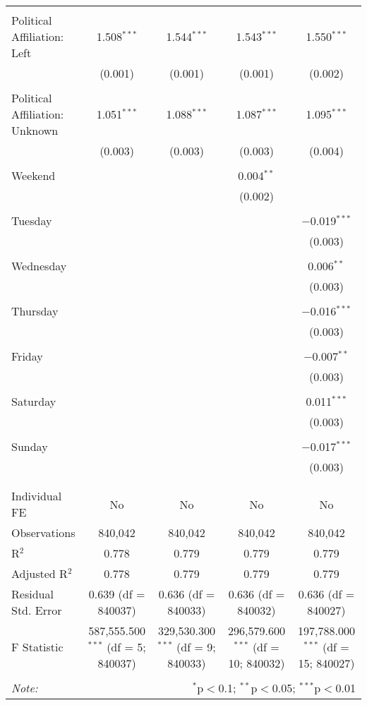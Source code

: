 \documentclass[
]{article}
\begin{document}
\begin{table}[!htbp]
{\begin{tabular}{@{\extracolsep{5pt}}lcccc}
  & & & & \\ 
 Political Affiliation: Left & 1.508$^{***}$ & 1.544$^{***}$ & 1.543$^{***}$ & 1.550$^{***}$ \\ 
  & (0.001) & (0.001) & (0.001) & (0.002) \\ 
  & & & & \\ 
 Political Affiliation: Unknown & 1.051$^{***}$ & 1.088$^{***}$ & 1.087$^{***}$ & 1.095$^{***}$ \\ 
  & (0.003) & (0.003) & (0.003) & (0.004) \\ 
  & & & & \\ 
 Weekend &  &  & 0.004$^{**}$ &  \\ 
  &  &  & (0.002) &  \\ 
  & & & & \\ 
 Tuesday &  &  &  & $-$0.019$^{***}$ \\ 
  &  &  &  & (0.003) \\ 
  & & & & \\ 
 Wednesday &  &  &  & 0.006$^{**}$ \\ 
  &  &  &  & (0.003) \\ 
  & & & & \\ 
 Thursday &  &  &  & $-$0.016$^{***}$ \\ 
  &  &  &  & (0.003) \\ 
  & & & & \\ 
 Friday &  &  &  & $-$0.007$^{**}$ \\ 
  &  &  &  & (0.003) \\ 
  & & & & \\ 
 Saturday &  &  &  & 0.011$^{***}$ \\ 
  &  &  &  & (0.003) \\ 
  & & & & \\ 
 Sunday &  &  &  & $-$0.017$^{***}$ \\ 
  &  &  &  & (0.003) \\ 
  & & & & \\ 
\hline \\[-1.8ex] 
Individual FE & No & No & No & No \\ 
Observations & 840,042 & 840,042 & 840,042 & 840,042 \\ 
R$^{2}$ & 0.778 & 0.779 & 0.779 & 0.779 \\ 
Adjusted R$^{2}$ & 0.778 & 0.779 & 0.779 & 0.779 \\ 
Residual Std. Error & 0.639 (df = 840037) & 0.636 (df = 840033) & 0.636 (df = 840032) & 0.636 (df = 840027) \\ 
F Statistic & 587,555.500$^{***}$ (df = 5; 840037) & 329,530.300$^{***}$ (df = 9; 840033) & 296,579.600$^{***}$ (df = 10; 840032) & 197,788.000$^{***}$ (df = 15; 840027) \\ 
\hline 
\hline \\[-1.8ex] 
\textit{Note:}  & \multicolumn{4}{r}{$^{*}$p$<$0.1; $^{**}$p$<$0.05; $^{***}$p$<$0.01} \\ 
\end{tabular}
} 
\end{table} 
\newpage
\end{document}
